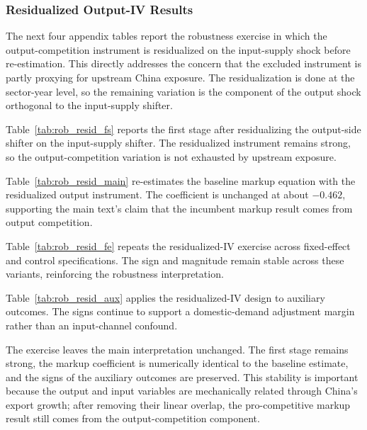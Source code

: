 ﻿\documentclass[12pt]{article}
\begin{document}
\small
\renewcommand{\arraystretch}{1}
\subsubsection{Residualized Output-IV Results}

The next four appendix tables report the robustness exercise in which the output-competition instrument is residualized on the input-supply shock before re-estimation. This directly addresses the concern that the excluded instrument is partly proxying for upstream China exposure. The residualization is done at the sector-year level, so the remaining variation is the component of the output shock orthogonal to the input-supply shifter.



Table~\ref{tab:rob_resid_fs} reports the first stage after residualizing the output-side shifter on the input-supply shifter. The residualized instrument remains strong, so the output-competition variation is not exhausted by upstream exposure.



Table~\ref{tab:rob_resid_main} re-estimates the baseline markup equation with the residualized output instrument. The coefficient is unchanged at about $-0.462$, supporting the main text's claim that the incumbent markup result comes from output competition.



Table~\ref{tab:rob_resid_fe} repeats the residualized-IV exercise across fixed-effect and control specifications. The sign and magnitude remain stable across these variants, reinforcing the robustness interpretation.



Table~\ref{tab:rob_resid_aux} applies the residualized-IV design to auxiliary outcomes. The signs continue to support a domestic-demand adjustment margin rather than an input-channel confound.

The exercise leaves the main interpretation unchanged. The first stage remains strong, the markup coefficient is numerically identical to the baseline estimate, and the signs of the auxiliary outcomes are preserved. This stability is important because the output and input variables are mechanically related through China's export growth; after removing their linear overlap, the pro-competitive markup result still comes from the output-competition component.
\end{document}

